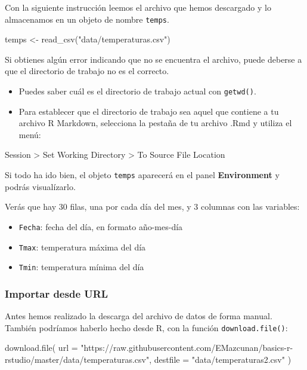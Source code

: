 \documentclass[
  title=normal,
  notoc,
  bib=normal]{mnye}
\newenvironment{Shaded}{\begin{snugshade}}{\end{snugshade}}
\newcommand{\AttributeTok}[1]{\textcolor[rgb]{0.77,0.63,0.00}{#1}}
\newcommand{\FunctionTok}[1]{\textcolor[rgb]{0.00,0.00,0.00}{#1}}
\newcommand{\NormalTok}[1]{#1}
\newcommand{\OtherTok}[1]{\textcolor[rgb]{0.56,0.35,0.01}{#1}}
\newcommand{\StringTok}[1]{\textcolor[rgb]{0.31,0.60,0.02}{#1}}
\providecommand{\tightlist}{%
  \setlength{\itemsep}{0pt}\setlength{\parskip}{0pt}}
\begin{document}
Con la siguiente instrucción leemos el archivo que hemos descargado y lo almacenamos en un objeto de nombre \texttt{temps}.

\begin{Shaded}
\begin{Highlighting}[]
\NormalTok{temps }\OtherTok{\textless{}{-}} \FunctionTok{read\_csv}\NormalTok{(}\StringTok{"data/temperaturas.csv"}\NormalTok{)}
\end{Highlighting}
\end{Shaded}

Si obtienes algún error indicando que no se encuentra el archivo, puede deberse a que el directorio de trabajo no es el correcto.

\begin{itemize}
\item
  Puedes saber cuál es el directorio de trabajo actual con \texttt{getwd()}.
\item
  Para establecer que el directorio de trabajo sea aquel que contiene a tu archivo R Markdown, selecciona la pestaña de tu archivo .Rmd y utiliza el menú:
\end{itemize}

Session \textgreater{} Set Working Directory \textgreater{} To Source File Location

Si todo ha ido bien, el objeto \texttt{temps} aparecerá en el panel \textbf{Environment} y podrás visualízarlo.

Verás que hay \(30\) filas, una por cada día del mes, y \(3\) columnas con las variables:

\begin{itemize}
\tightlist
\item
  \texttt{Fecha}: fecha del día, en formato año-mes-día
\item
  \texttt{Tmax}: temperatura máxima del día
\item
  \texttt{Tmin}: temperatura mínima del día
\end{itemize}

\hypertarget{importar-desde-url}{%
\subsubsection{Importar desde URL}\label{importar-desde-url}}

Antes hemos realizado la descarga del archivo de datos de forma manual. También podríamos haberlo hecho desde \textsf{R}, con la función \texttt{download.file()}:

\begin{Shaded}
\begin{Highlighting}[]
\FunctionTok{download.file}\NormalTok{(}
    \AttributeTok{url =} \StringTok{"https://raw.githubusercontent.com/EMazcunan/basics{-}r{-}rstudio/master/data/temperaturas.csv"}\NormalTok{,}
    \AttributeTok{destfile =} \StringTok{"data/temperaturas2.csv"}
\NormalTok{)}
\end{Highlighting}
\end{Shaded}
\end{document}
